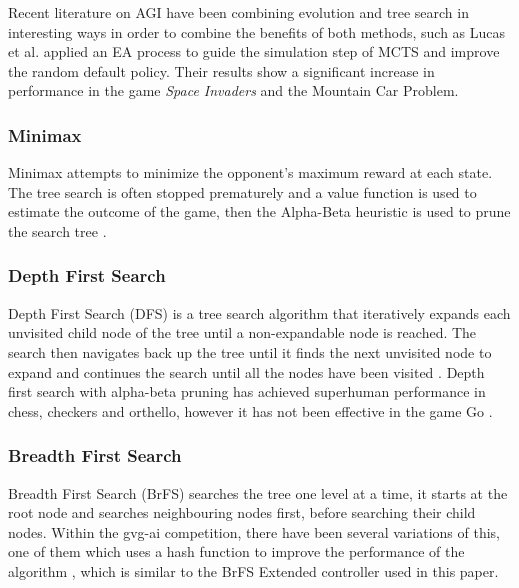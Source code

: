 \documentclass[journal]{IEEEtran}
\begin{document}
			Recent literature on AGI have been combining evolution and tree search in interesting ways in order to combine the benefits of both methods, such as Lucas et al. \cite{lucas2014fast} applied an EA process to guide the simulation step of MCTS and improve the random default policy. Their results show a significant increase in performance in the game \textit{Space Invaders} and the Mountain Car Problem.
			
		
		
		\subsubsection{Minimax}

				Minimax attempts to minimize the opponent's maximum reward at each state. The tree search is often stopped prematurely and a value function is used to estimate the outcome of the game, then the Alpha-Beta heuristic is used to prune the search tree \cite{browne2012survey, knuth1975analysis}.
			


		\subsubsection{Depth First Search}
				Depth First Search (DFS) is a tree search algorithm that iteratively expands each unvisited child node of the tree until a non-expandable node is reached. The search then navigates back up the tree until it finds the next unvisited node to expand and continues the search until all the nodes have been visited \cite{perez2014solving}.
				Depth first search with alpha-beta pruning \cite{knuth1975analysis} has achieved superhuman performance in chess, checkers and orthello, however it has not been effective in the game Go \cite{silver2016mastering}.
			
		
		
		\subsubsection{Breadth First Search} \label{sssec:BrFS}
			Breadth First Search (BrFS) searches the tree one level at a time, it starts at the root node and searches neighbouring nodes first, before searching their child nodes. Within the gvg-ai competition, there have been several variations of this, one of them which uses a hash function to
improve the performance of the algorithm \cite{EfficientBFS}, which is similar to the BrFS Extended controller used in this paper.
\end{document}
